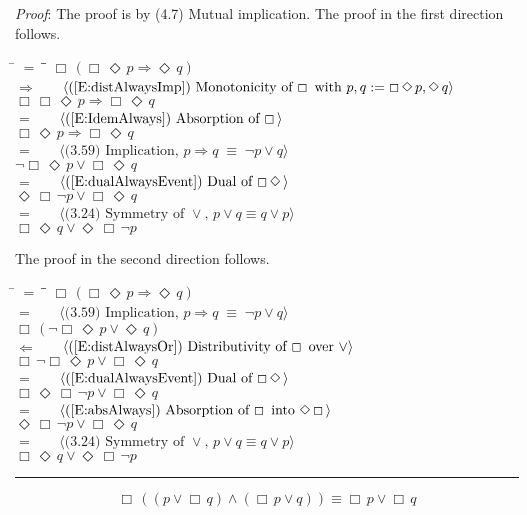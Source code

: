 \documentclass[12pt, fleqn, leqno]{article}
\newcommand{\lgap}{2pt}                             %
\newcommand{\mymathindent}{24pt}                    %
\newcommand{\equivs}{\ensuremath{\;\equiv\;}}       %
\newcommand{\impl}{\ensuremath{\Rightarrow}}        %
\newcommand{\foll}{\ensuremath{\Leftarrow}}         %
\newcommand{\Event}{\Diamond\,}
\newcommand{\Always}{\Box\,}
\newcommand{\myqed}{\rule[-.23ex]{1.2ex}{2.0ex}}
\newcommand{\myqedtab}{\hspace{384pt}}              %
\newcommand{\Gll} {\langle}                         %
\newcommand{\Ggg} {\rangle}                         %
\newcommand{\Hint}[1]     {\ \ \ $\Gll              \mbox{#1} \Ggg$ }   %
\begin{document}
\emph{Proof}: The proof is by (4.7) Mutual implication.
The proof in the first direction follows.
\begin{tabbing}
\hspace{\mymathindent} \= $= \;$ \= \myqedtab \= \kill
  \> \>   $\Always (\Always\Event p \impl \Event q)$\\[\lgap]
  \> $\impl$  \>  \Hint{(\ref{E:distAlwaysImp}) Monotonicity of $\Always$ with $p,q := \Always\Event p, \Event q$}\\[\lgap]
  \> \>   $\Always\Always\Event p \impl \Always\Event q$\\[\lgap]
   \> $=$  \>  \Hint{(\ref{E:IdemAlways}) Absorption of $\Always$}\\[\lgap]
 \> \>   $\Always\Event p \impl \Always\Event q$\\[\lgap]
 \> $=$  \>  \Hint{(3.59) Implication, $p\impl q \equivs \neg p \lor q$}\\[\lgap]
 \> \>   $\neg\Always\Event p \lor \Always\Event q$\\[\lgap]
  \> $=$  \>  \Hint{(\ref{E:dualAlwaysEvent}) Dual of $\Always \Event$}\\[\lgap]
  \> \>   $\Event\Always\neg p \lor \Always\Event q$\\[\lgap]
 \> $=$  \>  \Hint{(3.24) Symmetry of $\lor$, $p\lor q \equiv q\lor p$}\\[\lgap]
  \> \>   $ \Always\Event q \lor \Event\Always\neg p $
\end{tabbing}
The proof in the second direction follows.
\begin{tabbing}
\hspace{\mymathindent} \= $= \;$ \= \myqedtab \= \kill
 \> \>   $\Always (\Always\Event p \impl \Event q)$\\[\lgap]
 \> $=$  \>  \Hint{(3.59) Implication, $p\impl q \equivs \neg p \lor q$}\\[\lgap]
 \> \>   $\Always (\neg\Always\Event p \lor \Event q)$\\[\lgap]
  \> $\foll$  \>  \Hint{(\ref{E:distAlwaysOr}) Distributivity of $\Always$ over $\lor$}\\[\lgap]
  \> \>   $\Always\neg\Always\Event p \lor \Always\Event q$\\[\lgap]
   \> $=$  \>  \Hint{(\ref{E:dualAlwaysEvent}) Dual of $\Always \Event$}\\[\lgap]
 \> \>   $\Always\Event\Always\neg p \lor \Always\Event q$\\[\lgap]
  \> $=$  \>  \Hint{(\ref{E:absAlways}) Absorption of $\Always$ into $\Event\Always$}\\[\lgap]
  \> \>   $\Event\Always\neg p \lor \Always\Event q$\\[\lgap]
 \> $=$  \>  \Hint{(3.24) Symmetry of $\lor$, $p\lor q \equiv q\lor p$}\\[\lgap]
  \> \>   $ \Always\Event q \lor \Event\Always\neg p $ \quad \myqed
\end{tabbing}
\begin{equation}\label{E:BenAriequiv2}
\Always ((p \lor \Always q) \land (\Always p \lor q)) \equiv \Always p \lor \Always q
\end{equation}
\end{document}
